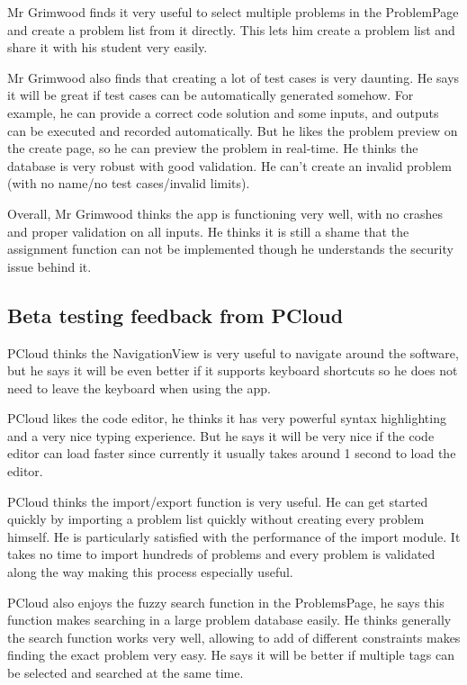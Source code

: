 \documentclass[report.tex]{subfiles}
\begin{document}
Mr Grimwood finds it very useful to select multiple problems in the ProblemPage and create a problem list from it directly. This lets him create a problem list and share it with his student very easily.

Mr Grimwood also finds that creating a lot of test cases is very daunting. He says it will be great if test cases can be automatically generated somehow. For example, he can provide a correct code solution and some inputs, and outputs can be executed and recorded automatically. But he likes the problem preview on the create page, so he can preview the problem in real-time. He thinks the database is very robust with good validation. He can't create an invalid problem (with no name/no test cases/invalid limits).

Overall, Mr Grimwood thinks the app is functioning very well, with no crashes and proper validation on all inputs. He thinks it is still a shame that the assignment function can not be implemented though he understands the security issue behind it.

\subsection{Beta testing feedback from PCloud}

PCloud thinks the NavigationView is very useful to navigate around the software, but he says it will be even better if it supports keyboard shortcuts so he does not need to leave the keyboard when using the app.

PCloud likes the code editor, he thinks it has very powerful syntax highlighting and a very nice typing experience. But he says it will be very nice if the code editor can load faster since currently it usually takes around 1 second to load the editor.

PCloud thinks the import/export function is very useful. He can get started quickly by importing a problem list quickly without creating every problem himself. He is particularly satisfied with the performance of the import module. It takes no time to import hundreds of problems and every problem is validated along the way making this process especially useful.

PCloud also enjoys the fuzzy search function in the ProblemsPage, he says this function makes searching in a large problem database easily. He thinks generally the search function works very well, allowing to add of different constraints makes finding the exact problem very easy. He says it will be better if multiple tags can be selected and searched at the same time.
\end{document}

